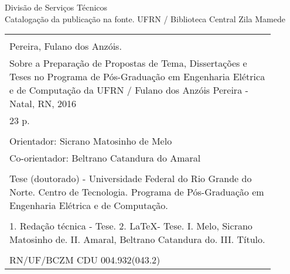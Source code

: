 %
%

\newpage

\begin{center}

\vspace*{\fill}

Divisão de Serviços Técnicos\\[1ex]
Catalogação da publicação na fonte.
UFRN / Biblioteca Central Zila Mamede

\vspace{2ex}

\begin{tabular}{|p{0.9\linewidth}|} \hline
\\
Pereira, Fulano dos Anzóis.\\
\hspace{1em} Sobre a Preparação de Propostas de Tema, Dissertações
e Teses no Programa de Pós-Graduação em Engenharia Elétrica e de Computação da UFRN /
Fulano dos Anzóis Pereira - Natal, RN, 2016 \\
\hspace{1em} 23 p. \\
\\
\hspace{1em} Orientador: Sicrano Matosinho de Melo \\
\hspace{1em} Co-orientador: Beltrano Catandura do Amaral \\
\\
\hspace{1em} Tese (doutorado) - Universidade Federal do Rio Grande do Norte.
Centro de Tecnologia. Programa de Pós-Graduação em Engenharia Elétrica e de Computação. \\
\\
\hspace{1em} 1. Redação técnica - Tese. 2. \LaTeX - Tese.
I. Melo, Sicrano Matosinho de. II. Amaral, Beltrano Catandura do.
III. Título. \\
\\
RN/UF/BCZM \hfill CDU 004.932(043.2) \\ \hline
\end{tabular} 

\end{center}
